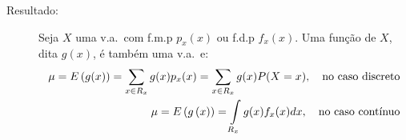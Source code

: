 \begin{description}
       \item [Resultado:] Seja $X$ uma v.a.\ com f.m.p $p_{x}(x)$ ou f.d.p $f_{x}(x)$. Uma função
         de $X$, dita $g(x)$, é também uma v.a.\ e: 
         \begin{align}
           \mu=E\left(g(x)\right)=\sum \limits_{x \in R_{x}} g(x)p_{x}(x)
           =\sum \limits_{x \in R_{x}} g(x)P(X=x), \text{\quad no caso discreto} \nonumber \\
        \mu=   E\left(g \left(x \right)\right)=\int \limits_{R_{x}} g(x)f_{x}(x)dx, \text{\quad no caso contínuo}
         \end{align}

     \end{description}

